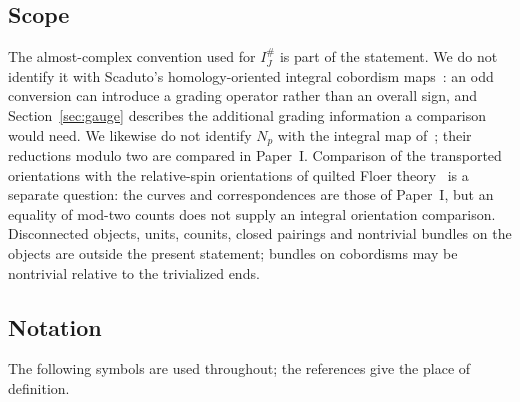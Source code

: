 \documentclass[11pt]{amsart}
\theoremstyle{definition}
\theoremstyle{remark}
\theoremstyle{plain}
\numberwithin{equation}{section}
\newcommand{\IG}{I^{\#}_{J}}
\begin{document}
\subsection{Scope}
The almost-complex convention used for $\IG$ is part of the statement. We do not identify it with
Scaduto's homology-oriented integral cobordism maps~\cite{Scaduto}: an odd conversion can introduce
a grading operator rather than an overall sign, and Section~\ref{sec:gauge} describes the additional
grading information a comparison would need. We likewise do not identify $N_p$ with the integral map
of~\cite{DFL}; their reductions modulo two are compared in Paper~I. Comparison of the transported
orientations with the relative-spin orientations of quilted Floer
theory~\cite{WW-orientations,WW-quilt} is a separate question: the curves and correspondences are
those of Paper~I, but an equality of mod-two counts does not supply an integral orientation
comparison. Disconnected objects, units, counits, closed pairings and nontrivial bundles on the
objects are outside the present statement; bundles on cobordisms may be nontrivial relative to the
trivialized ends.

\subsection{Notation}\label{subsec:notation}
The following symbols are used throughout; the references give the place of definition.
\end{document}
